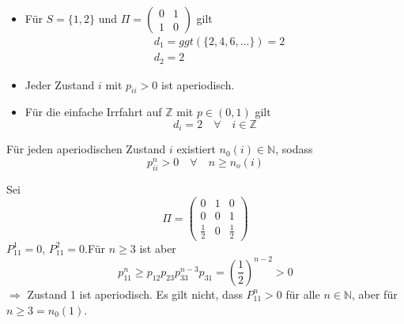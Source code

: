 \documentclass[a4paper,12pt]{article}
\begin{document}
\begin{tcolorbox}[breakable, colframe=blue, colback=white, title=Beispiel 12]
	\begin{itemize}

		\item Für $S = \{1,2\}$ und $\Pi = \begin{pmatrix}  0 & 1 \\ 1 & 0 \end{pmatrix}$ gilt
		      \begin{align*}
			       & d_1 = ggt\left(\{2,4,6,...\}\right) = 2 \\
			       & d_2 = 2
		      \end{align*}
		\item Jeder Zustand $i$ mit $p_{ii} > 0$ ist aperiodisch.
		\item Für die einfache Irrfahrt auf $\mathbb{Z}$ mit $p \in (0,1)$ gilt
		      $$
			      d_i = 2 \quad \forall \quad i \in \mathbb{Z}
		      $$
	\end{itemize}
\end{tcolorbox}


\begin{tcolorbox}[breakable, colframe=green, colback=white, title=Satz 16]
	Für jeden aperiodischen Zustand $i$ existiert $n_0(i) \in \mathbb{N}$, sodass
	$$
		p_{ii}^n > 0 \quad  \forall \quad n \geq n_o(i)
	$$
\end{tcolorbox}

\begin{tcolorbox}[breakable, colframe=blue, colback=white, title=Beispiel 13]
	Sei
	$$
		\Pi = \begin{pmatrix}
			0           & 1 & 0           \\
			0           & 0 & 1           \\
			\frac{1}{2} & 0 & \frac{1}{2}
		\end{pmatrix}
	$$
	$P_{11}^1 = 0$, $P_{11}^2= 0$.Für $n \geq 3$ ist aber
	$$
		p_{11}^n \geq p_{12}p_{23}p_{33}^{n-3}p_{31} = \left(\frac{1}{2}\right)^{n-2} > 0
	$$
	$\Rightarrow$ Zustand 1 ist aperiodisch. Es gilt nicht, dass $P_{11}^n > 0$ für alle $n \in \mathbb{N}$, aber für $n \geq 3 = n_0(1)$.
\end{tcolorbox}
\end{document}
